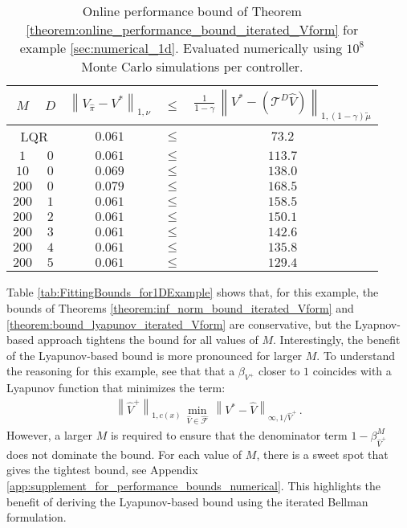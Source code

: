 \documentclass[journal]{IEEEtran}
\newcommand{\mcal}{\mathcal}
\begin{document}
\begin{table} [h]
	\centering
	\caption{Online performance bound of Theorem \ref{theorem:online_performance_bound_iterated_Vform} for example \ref{sec:numerical_1d}. Evaluated numerically using $10^8$ Monte Carlo simulations per controller.}
	\begin{tabular}{|c c|c c c|}
		\hline
		$M$
		& $D$
		& $\left\| V_{\hat{\pi}} \!-\! V^\ast \right\|_{1,\nu}$ 
		& $\leq$
		& $\frac{1}{1-\gamma} \, \left\| V^\ast \!-\! \left( \mcal{T}^{D} \hat{V} \right) \right\|_{1,(1\!-\!\gamma)\tilde{\mu}}$
		\\
		\hline
		\multicolumn{2}{|c|}{LQR}
		& $0.061$
		& $\leq$
		& $73.2$
		\\
$1$ & $0$
		& $0.061$
		& $\leq$
		& $113.7$
		\\
$10$ & $0$
		& $0.069$
		& $\leq$
		& $138.0$
		\\
$200$ & $0$
		& $0.079$
		& $\leq$
		& $168.5$
		\\
$200$ & $1$
		& $0.061$
		& $\leq$
		& $158.5$
		\\
$200$ & $2$
		& $0.061$
		& $\leq$
		& $150.1$
		\\
$200$ & $3$
		& $0.061$
		& $\leq$
		& $142.6$
		\\
$200$ & $4$
		& $0.061$
		& $\leq$
		& $135.8$
		\\
$200$ & $5$
		& $0.061$
		& $\leq$
		& $129.4$
		\\
		\hline
	\end{tabular}
	\label{tab:OnlineBounds_for1DExample}
\end{table}


Table \ref{tab:FittingBounds_for1DExample} shows that, for this example, the bounds of Theorems \ref{theorem:inf_norm_bound_iterated_Vform} and \ref{theorem:bound_lyapunov_iterated_Vform} are conservative, but the Lyapnov-based approach tightens the bound for all values of $M$. Interestingly, the benefit of the Lyapunov-based bound is more pronounced for larger $M$.
To understand the reasoning for this example, see that that a $\beta_{V^+}$ closer to $1$ coincides with a Lyapunov function that minimizes the term:
	\begin{equation} \nonumber
	\begin{aligned}
		\left\| \hat{V}^{+} \right\|_{1,c(x)} \, \min_{\hat{V}\in\hat{\mcal{F}}} \, \left\| V^\ast - \hat{V} \right\|_{\infty , 1/\hat{V}^{+}}
			\,.
	\end{aligned}
	\end{equation}
However, a larger $M$ is required to ensure that the denominator term $1-\beta^M_{\hat{V}^{+}}$ does not dominate the bound. For each value of $M$, there is a sweet spot that gives the tightest bound, see Appendix \ref{app:supplement_for_performance_bounds_numerical}. This highlights the benefit of deriving the Lyapunov-based bound using the iterated Bellman formulation.
\end{document}
